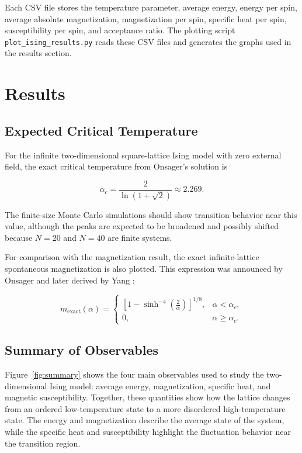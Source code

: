 \documentclass[11pt]{article}
\let\oldsection\section
\renewcommand{\section}[1]{\Needspace{3\baselineskip}\oldsection{#1}}
\let\oldsubsection\subsection
\renewcommand{\subsection}[1]{\Needspace{2\baselineskip}\oldsubsection{#1}}
\begin{document}
Each CSV file stores the temperature parameter, average energy, energy per spin, average absolute magnetization, magnetization per spin, specific heat per spin, susceptibility per spin, and acceptance ratio. The plotting script \texttt{plot\_ising\_results.py} reads these CSV files and generates the graphs used in the results section.

\section{Results}

\subsection{Expected Critical Temperature}

For the infinite two-dimensional square-lattice Ising model with zero external field, the exact critical temperature from Onsager's solution is \cite{onsager1944}

\medskip

\begin{equation}
\alpha_c = \frac{2}{\ln(1+\sqrt{2})} \approx 2.269.
\end{equation}

\medskip
The finite-size Monte Carlo simulations should show transition behavior near this value, although the peaks are expected to be broadened and possibly shifted because $N=20$ and $N=40$ are finite systems.

For comparison with the magnetization result, the exact infinite-lattice spontaneous magnetization is also plotted. This expression was announced by Onsager and later derived by Yang \cite{onsager1944,yang1952}:

\medskip

\begin{equation}
m_{\mathrm{exact}}(\alpha)=
\begin{cases}
\left[1-\sinh^{-4}\left(\frac{2}{\alpha}\right)\right]^{1/8},
& \alpha<\alpha_c, \\
0,
& \alpha\geq\alpha_c .
\end{cases}
\end{equation}

\medskip

\subsection{Summary of Observables}

Figure~\ref{fig:summary} shows the four main observables used to study the two-dimensional Ising model: average energy, magnetization, specific heat, and magnetic susceptibility. Together, these quantities show how the lattice changes from an ordered low-temperature state to a more disordered high-temperature state. The energy and magnetization describe the average state of the system, while the specific heat and susceptibility highlight the fluctuation behavior near the transition region.
\end{document}
